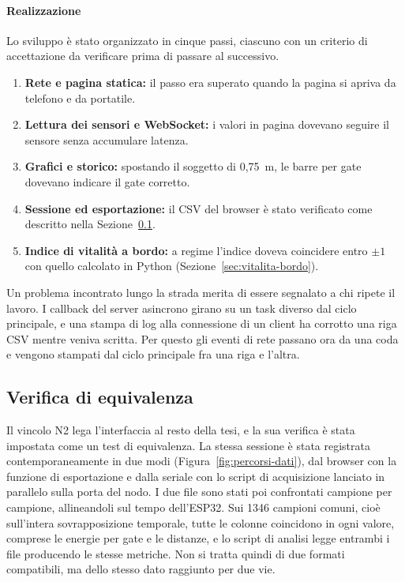 \paragraph{Realizzazione} Lo sviluppo è stato organizzato in cinque passi, ciascuno con un
criterio di accettazione da verificare prima di passare al successivo.
\begin{enumerate}
  \item \textbf{Rete e pagina statica:} il passo era superato quando la pagina si apriva da
    telefono e da portatile.
  \item \textbf{Lettura dei sensori e WebSocket:} i valori in pagina dovevano seguire il
    sensore senza accumulare latenza.
  \item \textbf{Grafici e storico:} spostando il soggetto di 0,75~m, le barre per gate
    dovevano indicare il gate corretto.
  \item \textbf{Sessione ed esportazione:} il CSV del browser è stato verificato come
    descritto nella Sezione~\ref{sec:webui-verifica}.
  \item \textbf{Indice di vitalità a bordo:} a regime l'indice doveva coincidere entro
    $\pm 1$ con quello calcolato in Python (Sezione~\ref{sec:vitalita-bordo}).
\end{enumerate}
Un problema incontrato lungo la strada merita di essere segnalato a chi ripete il lavoro.
I callback del server asincrono girano su un task diverso dal ciclo principale, e una
stampa di log alla connessione di un client ha corrotto una riga CSV mentre veniva
scritta. Per questo gli eventi di rete passano ora da una coda e vengono stampati dal
ciclo principale fra una riga e l'altra.

\subsection{Verifica di equivalenza}
\label{sec:webui-verifica}

Il vincolo N2 lega l'interfaccia al resto della tesi, e la sua verifica è stata impostata
come un test di equivalenza. La stessa sessione è stata registrata contemporaneamente in
due modi (Figura~\ref{fig:percorsi-dati}), dal browser con la funzione di esportazione e
dalla seriale con lo script di acquisizione lanciato in parallelo sulla porta del nodo. I
due file sono stati poi confrontati campione per campione, allineandoli sul tempo
dell'ESP32. Sui 1346 campioni comuni, cioè sull'intera sovrapposizione temporale, tutte le
colonne coincidono in ogni valore, comprese le energie per gate e le distanze, e lo script
di analisi legge entrambi i file producendo le stesse metriche. Non si tratta quindi di due
formati compatibili, ma dello stesso dato raggiunto per due vie.


